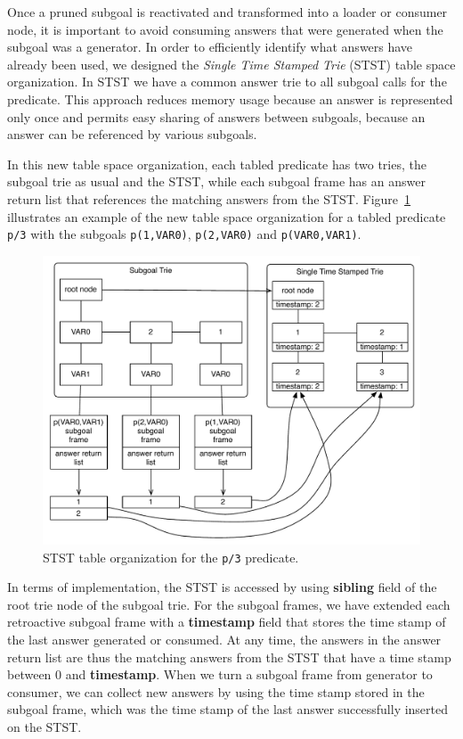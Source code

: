 Once a pruned subgoal is reactivated and transformed into a loader or consumer node,
it is important to avoid consuming answers that were generated when the subgoal was a
generator.
In order to efficiently identify what answers have already been used, we designed
the \textit{Single Time Stamped Trie} (STST) table space organization.
In STST we have a common answer trie to all subgoal calls for the predicate. This approach
reduces memory usage because an answer is represented only once and permits easy sharing of
answers between subgoals, because an answer can be referenced by various subgoals.

In this new table space organization, each tabled predicate has two tries, the subgoal trie as usual and
the STST, while each subgoal frame has an answer return list that references the matching answers
from the STST. Figure~\ref{fig:stst} illustrates an example of the new table space organization
for a tabled predicate \texttt{p/3} with the subgoals \texttt{p(1,VAR0)}, \texttt{p(2,VAR0)} and \texttt{p(VAR0,VAR1)}.

\begin{figure}[ht]
  \centering
    \includegraphics[scale=0.6]{stst.pdf}
  \caption{STST table organization for the \texttt{p/3} predicate.}
  \label{fig:stst}
\end{figure}

In terms of implementation, the STST is accessed by using \textbf{sibling} field of the root
trie node of the subgoal trie.
For the subgoal frames, we have extended each retroactive subgoal
frame with a \textbf{timestamp} field that stores the time stamp of the last answer
generated or consumed.
At any time, the answers in the answer return list are thus the matching 
answers from the STST that have a time stamp between 0 and \textbf{timestamp}.
When we turn a subgoal frame from generator to consumer,
we can collect new answers by using the time stamp stored in the subgoal frame, which was the
time stamp of the last answer successfully inserted on the STST.

